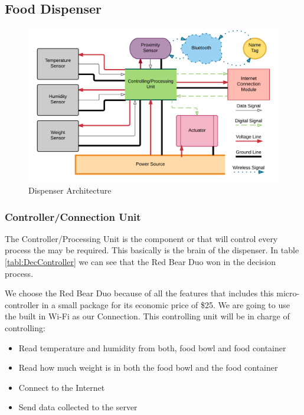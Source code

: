 \documentclass[12pt]{article}
\begin{document}
\subsection{Food Dispenser}

\begin{figure}[!htb]
  \includegraphics[width=\textwidth]{Figures/ArchitectureDispenser}
  \caption{Dispenser Architecture}
  \label{fig:ArchDispenser}
\end{figure}

\subsubsection{Controller/Connection Unit}

The Controller/Processing Unit is the component or that will control every process the may be required. This basically is the brain of the dispenser. In table \ref{tabl:DecController} we can see that the Red Bear Duo won in the decision process.

We choose the Red Bear Duo because of all the features that includes this micro-controller in a small package for its economic price of \$25. We are going to use the built in Wi-Fi  as our Connection. This controlling unit will be in charge of controlling:

\begin{itemize}
  \item Read temperature and humidity from both, food bowl and food container
  \item Read how much weight is in both the food bowl and the food container
  \item Connect to the Internet
  \item Send data collected to the server
\end{itemize}
\end{document}

